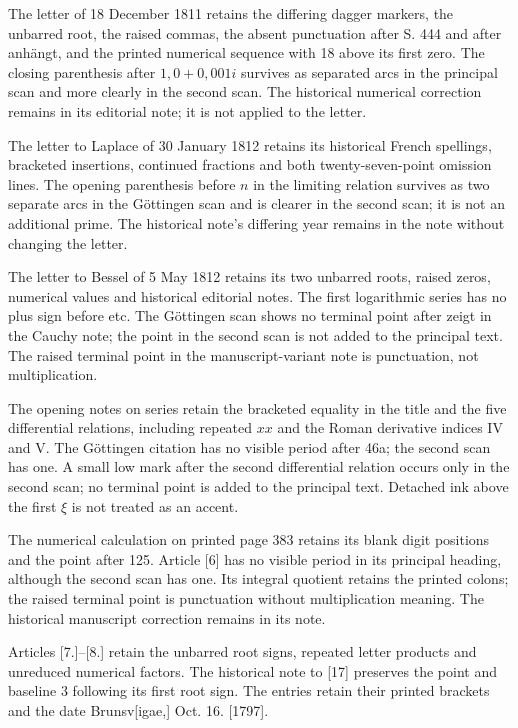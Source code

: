 \par The letter of 18 December 1811 retains the differing dagger markers, the unbarred root, the raised commas, the absent punctuation after S. 444 and after anhängt, and the printed numerical sequence with 18 above its first zero. The closing parenthesis after $1{,}0+0{,}001i$ survives as separated arcs in the principal scan and more clearly in the second scan. The historical numerical correction remains in its editorial note; it is not applied to the letter.

\par The letter to Laplace of 30 January 1812 retains its historical French spellings, bracketed insertions, continued fractions and both twenty-seven-point omission lines. The opening parenthesis before $n$ in the limiting relation survives as two separate arcs in the Göttingen scan and is clearer in the second scan; it is not an additional prime. The historical note’s differing year remains in the note without changing the letter.

\par The letter to Bessel of 5 May 1812 retains its two unbarred roots, raised zeros, numerical values and historical editorial notes. The first logarithmic series has no plus sign before etc. The Göttingen scan shows no terminal point after zeigt in the Cauchy note; the point in the second scan is not added to the principal text. The raised terminal point in the manuscript-variant note is punctuation, not multiplication.





The opening notes on series retain the bracketed equality in the title and the five differential relations, including repeated $xx$ and the Roman derivative indices IV and V. The Göttingen citation has no visible period after 46a; the second scan has one. A small low mark after the second differential relation occurs only in the second scan; no terminal point is added to the principal text. Detached ink above the first $\xi$ is not treated as an accent.

The numerical calculation on printed page 383 retains its blank digit positions and the point after 125. Article [6] has no visible period in its principal heading, although the second scan has one. Its integral quotient retains the printed colons; the raised terminal point is punctuation without multiplication meaning. The historical manuscript correction remains in its note.

Articles [7.]–[8.] retain the unbarred root signs, repeated letter products and unreduced numerical factors. The historical note to [17] preserves the point and baseline 3 following its first root sign. The entries retain their printed brackets and the date Brunsv[igae,] Oct. 16. [1797].

